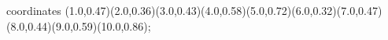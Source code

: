 					coordinates { (1.0,0.47)(2.0,0.36)(3.0,0.43)(4.0,0.58)(5.0,0.72)(6.0,0.32)(7.0,0.47)(8.0,0.44)(9.0,0.59)(10.0,0.86)};